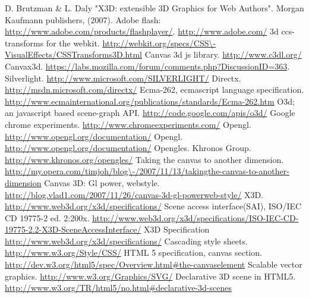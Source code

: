  D. Brutzman \& L. Daly "X3D: extensible 3D Graphics for Web Authors". Morgan Kaufmann publishers, (2007).
 Adobe flash: \url{http://www.adobe.com/products/flashplayer/}.
 \url{http://www.adobe.com/}
 3d ccs-transforms for the webkit. \url{http://webkit.org/specs/CSS\-VisualEffects/CSSTransforms3D.html}
 Canvas 3d js library. \url{http://www.c3dl.org/}
 Canvax3d. \url{https://labs.mozilla.com/forum/comments.php?DiscussionID=363}.
 Silverlight. \url{http://www.microsoft.com/SILVERLIGHT/}
 Directx. \url{http://msdn.microsoft.com/directx/}
 Ecma-262, ecmascript language specification. \url{http://www.ecmainternational.org/publications/standards/Ecma-262.htm}
 O3d; an javascript based scene-graph API. \url{http://code.google.com/apis/o3d/}
 Google chrome experiments. \url{http://www.chromeexperiments.com/}
 Opengl. \url{http://www.opengl.org/documentation/}
 Opengl. \url{http://www.opengl.org/documentation/}
 Opengles. Khronos Group. \url{http://www.khronos.org/opengles/}
 Taking the canvas to another dimension. \url{http://my.opera.com/timjoh/blog\-/2007/11/13/takingthe-canvas-to-another-dimension}
 Canvas 3D: Gl power, webstyle. \url{http://blog.vlad1.com/2007/11/26/canvas-3d-gl-powerweb-style/}
 X3D. \url{http://www.web3d.org/x3d/specifications/}
 Scene access interface(SAI), ISO/IEC CD 19775-2 ed. 2:200x. \url{http://www.web3d.org/x3d/specifications/ISO-IEC-CD-19775-2.2-X3D-SceneAccessInterface/}
 X3D Specification \url{http://www.web3d.org/x3d/specifications/}
 Cascading style sheets. \url{http://www.w3.org/Style/CSS/}
 HTML 5 specification, canvas section. \url{http://dev.w3.org/html5/spec/Overview.html\#the-canvaselement}
 Scalable vector graphics. \url{http://www.w3.org/Graphics/SVG/}
 Declarative 3D scene in HTML5. \url{http://www.w3.org/TR/html5/no.html\#declarative-3d-scenes}
